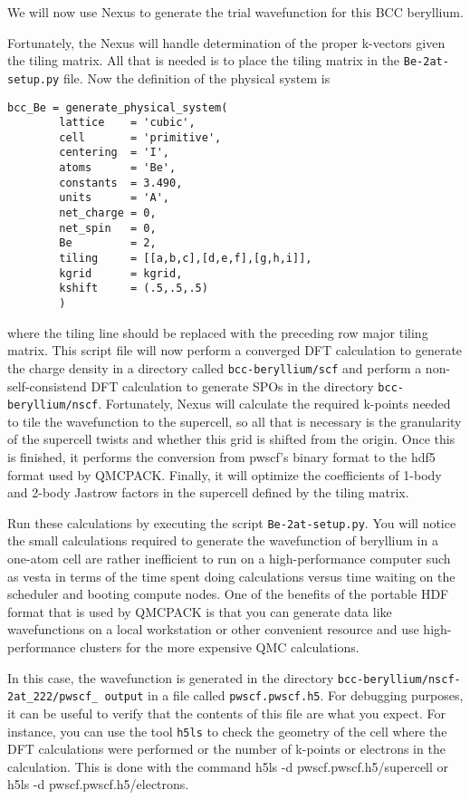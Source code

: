 We will now use Nexus to generate the trial wavefunction for this BCC beryllium.

Fortunately, the Nexus will handle determination of the proper k-vectors given the tiling matrix.  All that is needed is to place the tiling matrix in the \texttt{Be-2at-setup.py} file.   Now the definition of the physical system is

\begin{lstlisting}[style=Python]
    bcc_Be = generate_physical_system(
        lattice    = 'cubic',
        cell       = 'primitive',
        centering  = 'I',
        atoms      = 'Be',
        constants  = 3.490,
        units      = 'A',
        net_charge = 0,
        net_spin   = 0,
        Be         = 2,
        tiling     = [[a,b,c],[d,e,f],[g,h,i]],
        kgrid      = kgrid,
        kshift     = (.5,.5,.5)
        )
\end{lstlisting}
where the tiling line should be replaced with the preceding row major tiling matrix.  This script file will now perform a converged DFT calculation to generate the charge density in a directory called \texttt{bcc-beryllium/scf} and perform a non-self-consistend DFT calculation to generate SPOs in the directory \texttt{bcc-beryllium/nscf}.  Fortunately, Nexus will calculate the required k-points needed to tile the wavefunction to the supercell, so all that is necessary is the granularity of the supercell twists and whether this grid is shifted from the origin.  Once this is finished, it performs the conversion from pwscf's binary format to the hdf5 format used by QMCPACK.  Finally, it will optimize the coefficients of 1-body and 2-body Jastrow factors in the supercell defined by the tiling matrix.

Run these calculations by executing the script \texttt{Be-2at-setup.py}.  You will notice the small calculations required to generate the wavefunction of beryllium in a one-atom cell are rather inefficient to run on a high-performance computer such as vesta in terms of the time spent doing calculations versus time waiting on the scheduler and booting compute nodes.  One of the benefits of the portable HDF format that is used by QMCPACK is that you can generate data like wavefunctions on a local workstation or other convenient resource and use high-performance clusters for the more expensive QMC calculations.

In this case, the wavefunction is generated in the directory \texttt{bcc-beryllium/nscf-2at\_222/pwscf\_ output} in a file called \texttt{pwscf.pwscf.h5}.  For debugging purposes, it can be useful to verify that the contents of this file are what you expect.  For instance, you can use the tool \texttt{h5ls} to check the geometry of the cell where the DFT calculations were performed or the number of k-points or electrons in the calculation.  This is done with the command h5ls -d pwscf.pwscf.h5/supercell or h5ls -d pwscf.pwscf.h5/electrons.

